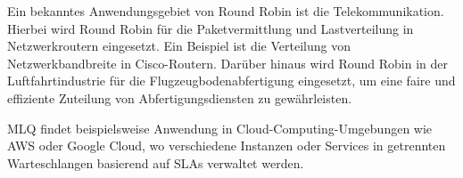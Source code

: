 Ein bekanntes Anwendungsgebiet von Round Robin ist die Telekommunikation. Hierbei wird Round Robin für die Paketvermittlung und Lastverteilung in Netzwerkroutern eingesetzt. Ein Beispiel ist die Verteilung von Netzwerkbandbreite in Cisco-Routern. %
Darüber hinaus wird Round Robin in der Luftfahrtindustrie für die Flugzeugbodenabfertigung eingesetzt, um eine faire und effiziente Zuteilung von Abfertigungsdiensten zu gewährleisten. %

\ac{MLQ} findet beispielsweise Anwendung in Cloud-Computing-Umgebungen wie AWS oder Google Cloud, wo verschiedene Instanzen oder Services in getrennten Warteschlangen basierend auf SLAs verwaltet werden. %



